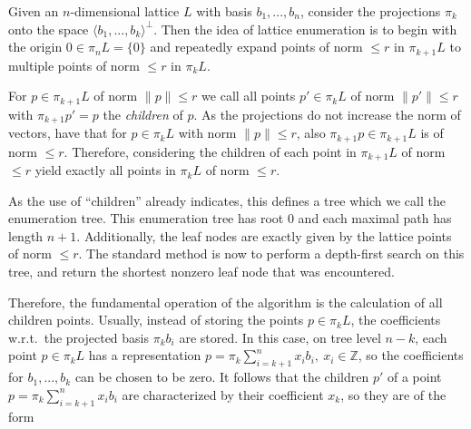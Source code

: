\documentclass{scrartcl}
\newcommand{\Z}{\mathbb{Z}}
\begin{document}
    Given an $n$-dimensional lattice $L$ with basis $b_1, ..., b_n$, consider the projections $\pi_k$ onto the space $\langle b_1, ..., b_k \rangle^\perp$. Then the idea of lattice enumeration is to begin with the origin $0 \in \pi_n L = \{ 0 \}$ and repeatedly expand points of norm $\leq r$ in $\pi_{k + 1} L$ to multiple points of norm $\leq r$ in $\pi_k L$.
    
    For $p \in \pi_{k + 1} L$ of norm $\| p \| \leq r$ we call all points $p' \in \pi_k L$ of norm $\| p' \| \leq r$ with $\pi_{k + 1} p' = p$ the \emph{children} of $p$. As the projections do not increase the norm of vectors, have that for $p \in \pi_k L$ with norm $\| p \| \leq r$, also $\pi_{k + 1} p \in \pi_{k + 1}L$ is of norm $\leq r$. Therefore, considering the children of each point in $\pi_{k + 1}L$ of norm $\leq r$ yield exactly all points in $\pi_k L$ of norm $\leq r$.

    As the use of ``children'' already indicates, this defines a tree which we call the enumeration tree. This enumeration tree has root $0$ and each maximal path has length $n + 1$. Additionally, the leaf nodes are exactly given by the lattice points of norm $\leq r$.
    The standard method is now to perform a depth-first search on this tree, and return the shortest nonzero leaf node that was encountered.

    Therefore, the fundamental operation of the algorithm is the calculation of all children points. Usually, instead of storing the points $p \in \pi_k L$, the coefficients w.r.t.\ the projected basis $\pi_k b_i$ are stored. 
    In this case, on tree level $n - k$, each point $p \in \pi_k L$ has a representation $p = \pi_k \sum_{i = k + 1}^n x_i b_i , \ x_i \in \Z$, so the coefficients for $b_1, ..., b_k$ can be chosen to be zero. 
    It follows that the children $p'$ of a point $p = \pi_k \sum_{i = k + 1}^n x_i b_i$ are characterized by their coefficient $x_k$, so they are of the form
    
\end{document}
